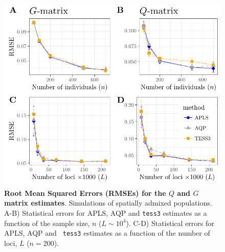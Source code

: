 \clearpage 
\newpage


\begin{figure}
  \centering
  \includegraphics[width=\textwidth]{./Figures/figure1.pdf}
  \caption{{\bf Root Mean Squared Errors (RMSEs) for the $Q$ and $G$ matrix
      estimates}. Simulations of spatially admixed populations. A-B) Statistical
    errors for APLS, AQP and {\tt tess3} estimates as a function of the sample
    size, $n$ ($L \sim 10^4$). C-D) Statistical errors for APLS, AQP and {\tt
      tess3} estimates as a function of the number of loci, $L$ ($n = 200$).}
  \label{fig:fig1}
\end{figure}  

\clearpage 
\newpage

